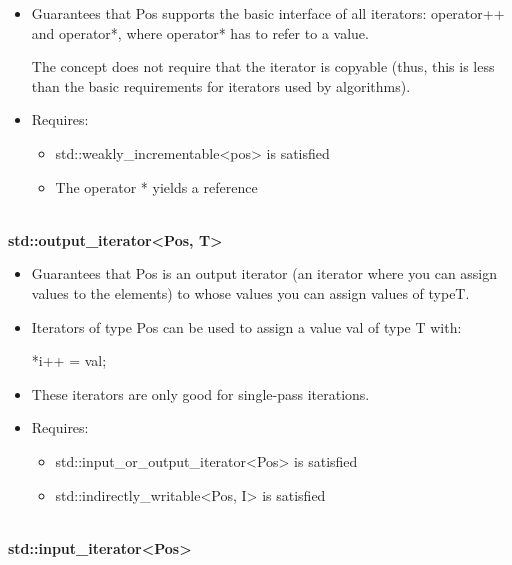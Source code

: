 \begin{itemize}
\item
Guarantees that Pos supports the basic interface of all iterators: operator++ and operator*, where operator* has to refer to a value.

The concept does not require that the iterator is copyable (thus, this is less than the basic requirements for iterators used by algorithms).

\item
Requires:
\begin{itemize}
\item
std::weakly\_incrementable<pos> is satisfied

\item
The operator * yields a reference
\end{itemize}
\end{itemize}

\noindent
\hspace*{\fill} \\ %
\textbf{std::output\_iterator<Pos, T>}

\begin{itemize}
\item
Guarantees that Pos is an output iterator (an iterator where you can assign values to the elements) to whose values you can assign values of typeT.

\item
Iterators of type Pos can be used to assign a value val of type T with:

\begin{cpp}
*i++ = val;
\end{cpp}

\item
These iterators are only good for single-pass iterations.

\item
Requires:
\begin{itemize}
\item
std::input\_or\_output\_iterator<Pos> is satisfied

\item
std::indirectly\_writable<Pos, I> is satisfied
\end{itemize}
\end{itemize}

\noindent
\hspace*{\fill} \\ %
\textbf{std::input\_iterator<Pos>}


